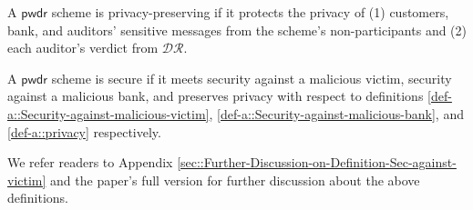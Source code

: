 \vspace{-4.2mm}

A $\mathsf{pwdr}$ scheme is privacy-preserving if it protects the privacy of (1)  customers, bank, and auditors' sensitive messages from the scheme's non-participants and (2) each auditor's verdict from $\mathcal{DR}$.%







\begin{definition}[Security]\label{def-a::PwDR-security}
A $\mathsf{pwdr}$ scheme is secure if it meets security against a malicious victim,  security against a malicious bank, and preserves privacy with respect to definitions \ref{def-a::Security-against-malicious-victim}, \ref{def-a::Security-against-malicious-bank}, and \ref{def-a::privacy} respectively. 
\end{definition}

We refer readers to Appendix \ref{sec::Further-Discussion-on-Definition-Sec-against-victim} and the paper's full version \cite{PwDR-full-ver} for further discussion about the above definitions. 


